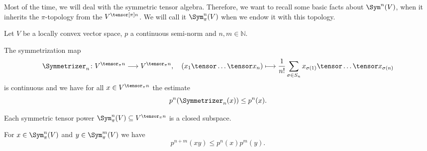 Most of the time, we will deal with the symmetric tensor algebra. Therefore, 
we want to recall some basic facts about $\Sym^n(V)$, when it inherits the 
$\pi$-topology from the $V^{\tensor[\pi] n}$. We will call it 
$\Sym_{\pi}^n(V)$ when we endow it with this topology.
\begin{lemma}
	\label{Lemma:LCAna:ProjTensSymm}
	Let $V$ be a locally convex vector space, $p$ a continuous semi-norm 
	and $n,m \in \mathbb{N}$.
	\begin{lemmalist}
		\item
		The symmetrization map
		\begin{equation*}
			\Symmetrizer_n
			\colon
			V^{\tensor_{\pi} n}
			\longrightarrow
			V^{\tensor_{\pi} n}
			, \quad
			(x_1 \tensor \ldots \tensor x_n)
			\longmapsto
			\frac{1}{n!}
			\sum\limits_{\sigma \in S_n}
			x_{\sigma(1)}
			\tensor \ldots \tensor
			x_{\sigma(n)}
		\end{equation*}
		is continuous and we have for all $x \in V^{\tensor_{\pi} n}$ 
		the estimate
		\begin{equation}
			\label{LCAna:SymmProdCont}
			p^n(\Symmetrizer_n(x))
			\leq
			p^n(x).
		\end{equation}
		
		\item
		Each symmetric tensor power $\Sym_{\pi}^n(V) \subseteq 
		V^{\tensor_{\pi} n}$ is a closed subspace.
		
		\item
		For $x \in \Sym_{\pi}^n(V)$ and $y \in \Sym_{\pi}^m(V)$ we have
		\begin{equation*}
			p^{n + m}(xy)
			\leq
			p^n(x) p^m(y).
		\end{equation*}
	\end{lemmalist}
\end{lemma}
